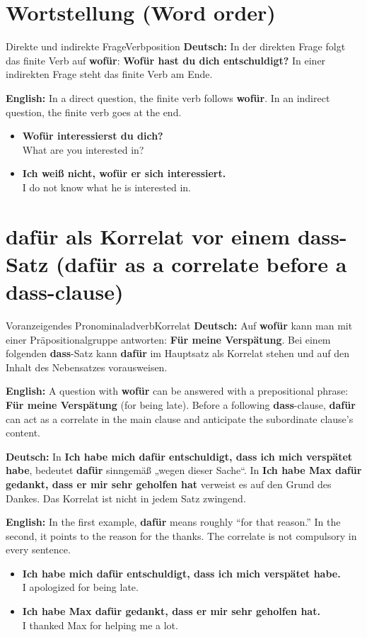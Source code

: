 \documentclass[a4paper,11pt]{article}
\newcommand{\GermanText}[1]{\textbf{Deutsch: }#1\par}
\newcommand{\EnglishText}[1]{{\small\color{SoftGray}\textbf{English: }#1\par}}
\newcommand{\ExampleItem}[2]{\item \textbf{#1}\\{\small\color{SoftGray}#2}}
\begin{document}
\section{Wortstellung (Word order)}
\begin{grammarentry}{Direkte und indirekte Frage}{Verbposition}
\GermanText{In der direkten Frage folgt das finite Verb auf \textbf{wofür}: \textbf{Wofür hast du dich entschuldigt?} In einer indirekten Frage steht das finite Verb am Ende.}
\EnglishText{In a direct question, the finite verb follows \textbf{wofür}. In an indirect question, the finite verb goes at the end.}
\end{grammarentry}
\begin{exbox}\begin{itemize}
\ExampleItem{Wofür interessierst du dich?}{What are you interested in?}
\ExampleItem{Ich weiß nicht, wofür er sich interessiert.}{I do not know what he is interested in.}
\end{itemize}\end{exbox}

\section{dafür als Korrelat vor einem dass-Satz (dafür as a correlate before a dass-clause)}
\begin{grammarentry}{Voranzeigendes Pronominaladverb}{Korrelat}
\GermanText{Auf \textbf{wofür} kann man mit einer Präpositionalgruppe antworten: \textbf{Für meine Verspätung}. Bei einem folgenden \textbf{dass}-Satz kann \textbf{dafür} im Hauptsatz als Korrelat stehen und auf den Inhalt des Nebensatzes vorausweisen.}
\EnglishText{A question with \textbf{wofür} can be answered with a prepositional phrase: \textbf{Für meine Verspätung} (for being late). Before a following \textbf{dass}-clause, \textbf{dafür} can act as a correlate in the main clause and anticipate the subordinate clause's content.}
\GermanText{In \textbf{Ich habe mich dafür entschuldigt, dass ich mich verspätet habe}, bedeutet \textbf{dafür} sinngemäß „wegen dieser Sache“. In \textbf{Ich habe Max dafür gedankt, dass er mir sehr geholfen hat} verweist es auf den Grund des Dankes. Das Korrelat ist nicht in jedem Satz zwingend.}
\EnglishText{In the first example, \textbf{dafür} means roughly “for that reason.” In the second, it points to the reason for the thanks. The correlate is not compulsory in every sentence.}
\end{grammarentry}
\begin{exbox}\begin{itemize}
\ExampleItem{Ich habe mich dafür entschuldigt, dass ich mich verspätet habe.}{I apologized for being late.}
\ExampleItem{Ich habe Max dafür gedankt, dass er mir sehr geholfen hat.}{I thanked Max for helping me a lot.}
\end{itemize}\end{exbox}
\end{document}
